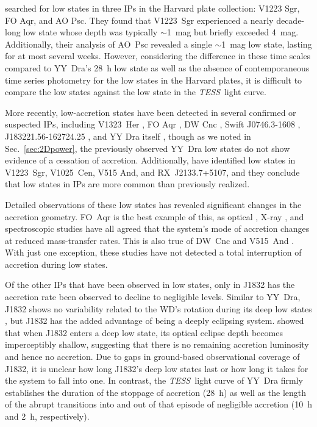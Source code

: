\documentclass[twocolumn]{aastex63}
\newcommand{\TESS}{\textit{TESS}}
\begin{document}
\citet{Garnavich88} searched for low states in three IPs in the Harvard plate collection: V1223 Sgr, FO Aqr, and AO Psc. They found that V1223~Sgr experienced a nearly decade-long low state whose depth was typically $\sim$1~mag but briefly exceeded 4~mag.
Additionally, their analysis of AO~Psc revealed a single $\sim$1~mag low state, lasting for at most several weeks. However, considering the difference in these time scales compared to YY~Dra's 28~h low state as well as the absence of contemporaneous time series photometry for the low states in the Harvard plates, it is difficult to compare the \citet{Garnavich88} low states against the low state in the \TESS\ light curve.

More recently, low-accretion states have been detected in several confirmed or suspected IPs, including V1323~Her \citep{V1323Her}, FO Aqr \citep{Littlefield16, Kennedy17}, DW Cnc \citep{Montero20}, Swift J0746.3-1608 \citep{Bernardini19}, J183221.56-162724.25 \citep[J1832;][]{beuermann}, and YY Dra itself \citep{Breus17}, though as we noted in Sec.~\ref{sec:2Dpower}, the previously observed YY~Dra low states do not show evidence of a cessation of accretion. Additionally, \citet{covington} have identified low states in V1223~Sgr, V1025~Cen, V515 And, and RX~J2133.7+5107, and they conclude that low states in IPs are more common than previously realized.

Detailed observations of these low states has revealed significant changes in the accretion geometry. FO~Aqr is the best example of this, as optical \citep{Littlefield16, Littlefield20}, X-ray \citep{Kennedy17}, and spectroscopic \citep{Kennedy20} studies have all agreed that the system's mode of accretion changes at reduced mass-transfer rates. This is also true of DW~Cnc and V515~And \citep{covington}. With just one exception, these studies have not detected a total interruption of accretion during low states. 

Of the other IPs that have been observed in low states, only in J1832 has the accretion rate been observed to decline to negligible levels. Similar to YY~Dra, J1832 shows no variability related to the WD's rotation during its deep low states \citep{beuermann}, but J1832 has the added advantage of being a deeply eclipsing system. \citet{beuermann} showed that when J1832 enters a deep low state, its optical eclipse depth becomes imperceptibly shallow, suggesting that there is no remaining accretion luminosity and hence no accretion. Due to gaps in ground-based observational coverage of J1832, it is unclear how long J1832's deep low states last or how long it takes for the system to fall into one. In contrast, the \TESS\ light curve of YY~Dra firmly establishes the duration of the stoppage of accretion (28~h) as well as the length of the abrupt transitions into and out of that episode of negligible accretion (10~h and 2~h, respectively).
\end{document}
